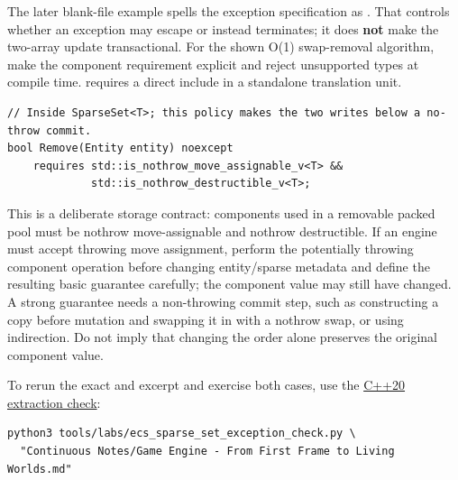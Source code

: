 The later blank-file  example spells the exception specification as . That controls whether an exception may escape or instead terminates; it does \textbf{not} make the two-array update transactional. For the shown O(1) swap-removal algorithm, make the component requirement explicit and reject unsupported types at compile time.  requires a direct  include in a standalone translation unit.

\begin{verbatim}
// Inside SparseSet<T>; this policy makes the two writes below a no-throw commit.
bool Remove(Entity entity) noexcept
    requires std::is_nothrow_move_assignable_v<T> &&
             std::is_nothrow_destructible_v<T>;
\end{verbatim}

This is a deliberate storage contract: components used in a removable packed pool must be nothrow move-assignable and nothrow destructible. If an engine must accept throwing move assignment, perform the potentially throwing component operation before changing entity/sparse metadata and define the resulting basic guarantee carefully; the component value may still have changed. A strong guarantee needs a non-throwing commit step, such as constructing a copy before mutation and swapping it in with a nothrow swap, or using indirection. Do not imply that changing the order alone preserves the original component value.

To rerun the exact  and  excerpt and exercise both cases, use the \hyperref[source-file-a82fe256cca93e1d7bd6eff8]{C++20 extraction check}:

\begin{verbatim}
python3 tools/labs/ecs_sparse_set_exception_check.py \
  "Continuous Notes/Game Engine - From First Frame to Living Worlds.md"
\end{verbatim}

